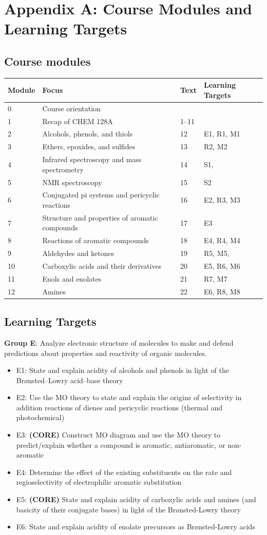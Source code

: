 \hypertarget{appendix-a}{%
\section{Appendix A: Course Modules and Learning
Targets}\label{appendix-a}}

\hypertarget{modules}{%
\subsection{Course modules}\label{modules}}

\begin{longtable}[]{@{}llll@{}}
\toprule
Module & Focus & Text & Learning Targets\tabularnewline
\midrule
\endhead
0 & Course orientation & &\tabularnewline
1 & Recap of CHEM 128A & 1--11 &\tabularnewline
2 & Alcohols, phenols, and thiols & 12 & E1, R1, M1\tabularnewline
3 & Ethers, epoxides, and sulfides & 13 & R2, M2\tabularnewline
4 & Infrared spectroscopy and mass spectrometry & 14 &
S1,\tabularnewline
5 & NMR spectroscopy & 15 & S2\tabularnewline
6 & Conjugated pi systems and pericyclic reactions & 16 & E2, R3,
M3\tabularnewline
7 & Structure and properties of aromatic compounds & 17 &
E3\tabularnewline
8 & Reactions of aromatic compounds & 18 & E4, R4, M4\tabularnewline
9 & Aldehydes and ketones & 19 & R5, M5,\tabularnewline
10 & Carboxylic acids and their derivatives & 20 & E5, R6,
M6\tabularnewline
11 & Enols and enolates & 21 & R7, M7\tabularnewline
12 & Amines & 22 & E6, R8, M8\tabularnewline
\bottomrule
\end{longtable}

\hypertarget{learning-targets}{%
\subsection{Learning Targets}\label{learning-targets}}

\textbf{Group E}: Analyze electronic structure of molecules to make and
defend predictions about properties and reactivity of organic molecules.

\begin{itemize}
\tightlist
\item
  E1: State and explain acidity of alcohols and phenols in light of the
  Brønsted--Lowry acid--base theory
\item
  E2: Use the MO theory to state and explain the origins of selectivity
  in addition reactions of dienes and pericyclic reactions (thermal and
  photochemical)
\item
  E3: \textbf{(CORE)} Construct MO diagram and use the MO theory to
  predict/explain whether a compound is aromatic, antiaromatic, or
  non-aromatic
\item
  E4: Determine the effect of the existing substituents on the rate and
  regioselectivity of electrophilic aromatic substitution
\item
  E5: \textbf{(CORE)} State and explain acidity of carboxylic acids and
  amines (and basicity of their conjugate bases) in light of the
  Brønsted-Lowry theory
\item
  E6: State and explain acidity of enolate precursors as Brønsted-Lowry
  acids
\end{itemize}

